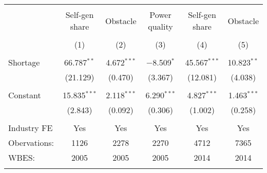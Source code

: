 
\begingroup 
\small 
\begin{tabular}{@{\extracolsep{5pt}}lccccc} 
\\[-1.8ex]\hline 
\hline \\[-1.8ex] 
 & Self-gen share & Obstacle & Power quality & Self-gen share & Obstacle \\ 
\\[-1.8ex] & (1) & (2) & (3) & (4) & (5)\\ 
\hline \\[-1.8ex] 
 Shortage & 66.787$^{**}$ & 4.672$^{***}$ & $-$8.509$^{*}$ & 45.567$^{***}$ & 10.823$^{**}$ \\ 
  & (21.129) & (0.470) & (3.367) & (12.081) & (4.038) \\ 
  & & & & & \\ 
 Constant & 15.835$^{***}$ & 2.118$^{***}$ & 6.290$^{***}$ & 4.827$^{***}$ & 1.463$^{***}$ \\ 
  & (2.843) & (0.092) & (0.306) & (1.002) & (0.258) \\ 
  & & & & & \\ 
Industry FE & Yes & Yes & Yes & Yes & Yes \\ 
Obervations: & 1126 & 2278 & 2270 & 4712 & 7365 \\ 
WBES: & 2005 & 2005 & 2005 & 2014 & 2014 \\ 
\hline \\[-1.8ex] 
\end{tabular} 
\endgroup 
